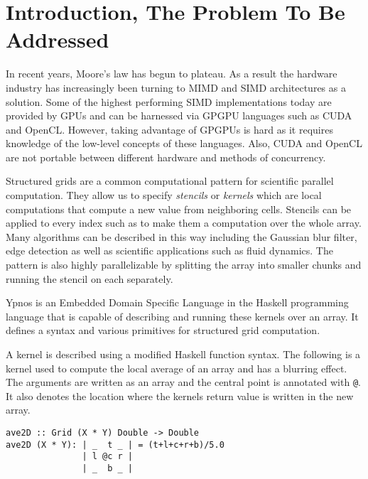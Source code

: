 





\section*{Introduction, The Problem To Be Addressed}

In recent years, Moore's law has begun to plateau. As a result the hardware 
industry has increasingly been turning to MIMD and SIMD architectures as a 
solution.  Some of the highest performing SIMD implementations today are 
provided by GPUs and can be harnessed via GPGPU languages such as CUDA and 
OpenCL.  However, taking advantage of GPGPUs is hard as it requires knowledge 
of the low-level concepts of these languages. Also, CUDA and OpenCL are not 
portable between different hardware and methods of concurrency.

Structured grids are a common computational pattern for scientific parallel 
computation. They allow us to specify \emph{stencils} or \emph{kernels} which 
are local computations that compute a new value from neighboring cells.  
Stencils can be applied to every index such as to make them a computation over 
the whole array.  Many algorithms can be described in this way including the 
Gaussian blur filter, edge detection as well as scientific applications such as 
fluid dynamics. The pattern is also highly parallelizable by splitting the 
array into smaller chunks and running the stencil on each separately.

Ypnos \cite{ypnos} is an Embedded Domain Specific Language in the Haskell 
programming language that is capable of describing and running these kernels 
over an array.  It defines a syntax and various primitives for structured grid 
computation.  

A kernel is described using a modified Haskell function syntax. The following 
is a kernel used to compute the local average of an array and has a blurring 
effect.  The arguments are written as an array and the central point is 
annotated with \verb|@|. It also denotes the location where the kernels return 
value is written in the new array.

\begin{verbatim}
ave2D :: Grid (X * Y) Double -> Double
ave2D (X * Y): | _  t _ | = (t+l+c+r+b)/5.0
               | l @c r |
               | _  b _ |
\end{verbatim}

